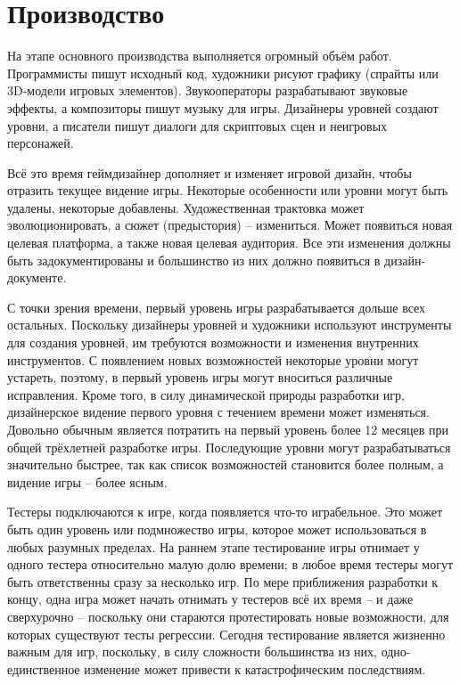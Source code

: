 \section{Производство}
На этапе основного производства выполняется огромный объём работ. Программисты пишут исходный код, художники
рисуют графику (спрайты или 3D-модели игровых элементов). Звукооператоры разрабатывают звуковые эффекты, а
композиторы пишут музыку для игры. Дизайнеры уровней создают уровни, а писатели пишут диалоги для скриптовых
сцен и неигровых персонажей.

Всё это время геймдизайнер дополняет и изменяет игровой дизайн, чтобы отразить текущее видение игры.
Некоторые особенности или уровни могут быть удалены, некоторые добавлены. Художественная трактовка может
эволюционировать, а сюжет (предыстория) -- измениться. Может появиться новая целевая платформа, а также
новая целевая аудитория. Все эти изменения должны быть задокументированы и большинство из них должно
появиться в дизайн-документе.

С точки зрения времени, первый уровень игры разрабатывается дольше всех остальных. Поскольку дизайнеры
уровней и художники используют инструменты для создания уровней, им требуются возможности и изменения
внутренних инструментов. С появлением новых возможностей некоторые уровни могут устареть, поэтому, в первый
уровень игры могут вноситься различные исправления. Кроме того, в силу динамической природы разработки игр,
дизайнерское видение первого уровня с течением времени может изменяться. Довольно обычным является потратить
на первый уровень более 12 месяцев при общей трёхлетней разработке игры. Последующие уровни могут
разрабатываться значительно быстрее, так как список возможностей становится более полным, а видение
игры -- более ясным.

Тестеры подключаются к игре, когда появляется что-то играбельное. Это может быть один уровень или
подмножество игры, которое может использоваться в любых разумных пределах. На раннем этапе тестирование
игры отнимает у одного тестера относительно малую долю времени; в любое время тестеры могут быть
ответственны сразу за несколько игр. По мере приближения разработки к концу, одна игра может начать отнимать
у тестеров всё их время -- и даже сверхурочно -- поскольку они стараются протестировать новые возможности,
для которых существуют тесты регрессии. Сегодня тестирование является жизненно важным для игр, поскольку, в
силу сложности большинства из них, одно-единственное изменение может привести к катастрофическим
последствиям.\cite{main}

